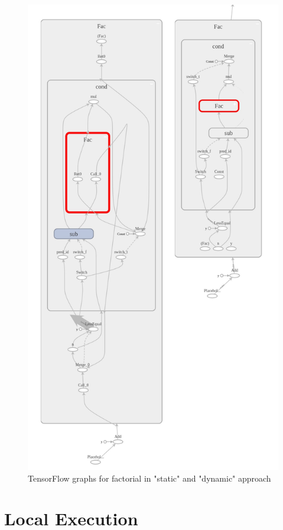 \documentclass[ack,preface]{dithesis}
\begin{document}
\begin{figure}
\centering
\includegraphics[scale=0.5]{figures/tf_factorial}
\caption{TensorFlow graphs for factorial in "static" and "dynamic" approach}
\end{figure}



    \section{Local Execution}
\end{document}
